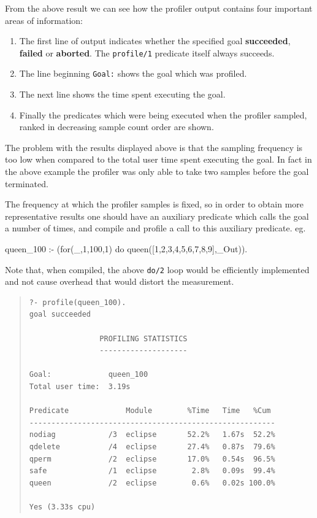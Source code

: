 From the above result we can see how the profiler output contains four
important areas of information:
\begin{enumerate}
\item The first line of output indicates whether the specified goal
\textbf{succeeded}, \textbf{failed} or \textbf{aborted}.  The
\verb+profile/1+ predicate itself always succeeds.
\item The line beginning \verb+Goal:+ shows the goal which was
profiled.
\item The next line shows the time spent executing the goal.
\item Finally the predicates which were being executed when the
profiler sampled, ranked in decreasing sample count order are shown.
\end{enumerate}

The problem with the results displayed above is that the sampling
frequency is too low when compared to the total user time spent
executing the goal.  In fact in the above example the profiler was
only able to take two samples before the goal terminated.

The frequency at which the profiler samples is fixed, so in order to
obtain more representative results one should have an auxiliary
predicate which calls the goal a number of times, and compile and
profile a call to this auxiliary predicate. eg.

\begin{code}
queen_100 :-
  (for(_,1,100,1) do queen([1,2,3,4,5,6,7,8,9],_Out)).
\end{code}

Note that, when compiled, the above \verb+do/2+ loop would be
efficiently implemented and not cause overhead that would distort the
measurement.  

\begin{quote}\begin{verbatim}
?- profile(queen_100).
goal succeeded

                PROFILING STATISTICS
                --------------------

Goal:             queen_100
Total user time:  3.19s

Predicate             Module        %Time   Time   %Cum
--------------------------------------------------------
nodiag            /3  eclipse       52.2%   1.67s  52.2%
qdelete           /4  eclipse       27.4%   0.87s  79.6%
qperm             /2  eclipse       17.0%   0.54s  96.5%
safe              /1  eclipse        2.8%   0.09s  99.4%
queen             /2  eclipse        0.6%   0.02s 100.0%

Yes (3.33s cpu)
\end{verbatim}\end{quote}

